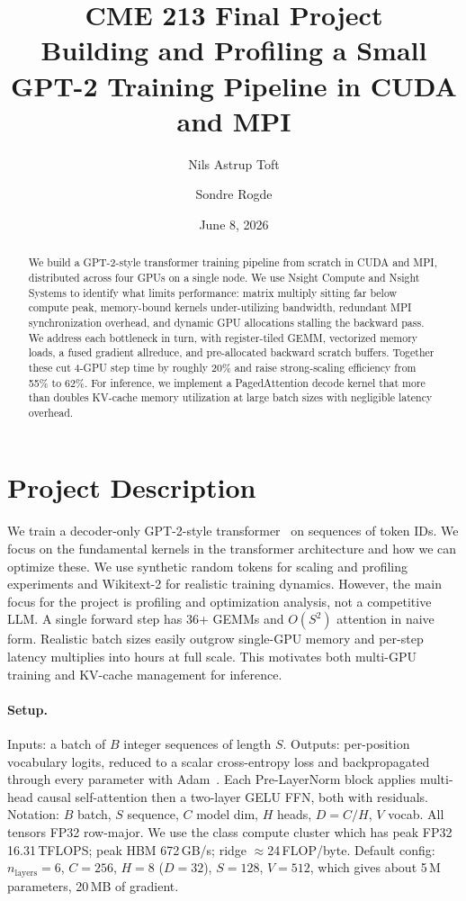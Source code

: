 \documentclass[11pt,letterpaper]{article}
\title{\vspace{-2em}CME 213 Final Project\\
\large Building and Profiling a Small GPT-2 Training Pipeline in CUDA and MPI}
\author{Nils Astrup Toft \and Sondre Rogde}
\date{June 8, 2026}
\begin{document}
\maketitle\vspace{-1.5em}

\begin{abstract}
We build a GPT-2-style transformer training pipeline from scratch in CUDA and MPI, distributed across four GPUs on a single node. We use Nsight Compute and Nsight Systems to
identify what limits performance: matrix multiply sitting far below compute peak, memory-bound kernels under-utilizing bandwidth, redundant MPI synchronization overhead, and dynamic GPU
allocations stalling the backward pass. We address each bottleneck in turn, with register-tiled GEMM, vectorized memory loads, a fused gradient allreduce, and pre-allocated backward scratch buffers.
Together these cut 4-GPU step time by roughly 20\% and raise strong-scaling efficiency from 55\% to 62\%. For inference, we implement a PagedAttention decode kernel that more than doubles KV-cache memory
utilization at large batch sizes with negligible latency overhead.
\end{abstract}

\section{Project Description}

We train a decoder-only GPT-2-style transformer~\cite{radford2019} on
sequences of token IDs. We focus on the fundamental kernels in the transformer architecture and how we can optimize these. We use
synthetic random tokens for scaling and profiling experiments and Wikitext-2 for realistic training dynamics. However, the main focus for the project is profiling and optimization analysis, not a competitive LLM. A single forward
step has 36+ GEMMs and $O(S^2)$ attention in naive form. Realistic batch
sizes easily outgrow single-GPU memory and per-step latency multiplies into hours
at full scale. This motivates both multi-GPU training and KV-cache
management for inference.

\paragraph{Setup.}
Inputs: a batch of $B$ integer sequences of length
$S$. Outputs: per-position vocabulary logits, reduced to a scalar
cross-entropy loss and backpropagated through every parameter with
Adam~\cite{kingma2015}. Each Pre-LayerNorm block applies multi-head causal
self-attention then a two-layer GELU FFN, both with residuals. Notation:
$B$ batch, $S$ sequence, $C$ model dim, $H$ heads, $D{=}C/H$, $V$ vocab.
All tensors FP32 row-major. We use the class compute cluster which has peak FP32 16.31\,TFLOPS; peak HBM 672\,GB/s; ridge
$\approx$24\,FLOP/byte. 
Default config: $n_\text{layers}{=}6$, $C{=}256$, $H{=}8$ ($D{=}32$),
$S{=}128$, $V{=}512$, which gives about 5\,M parameters, 20\,MB of gradient. 
\end{document}
